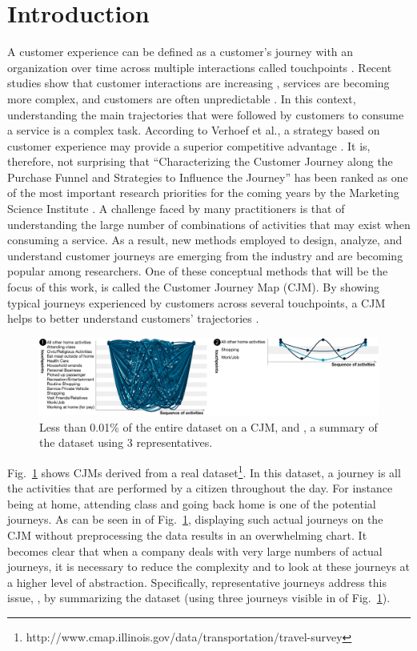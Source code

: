 \documentclass[runningheads]{llncs}
\begin{document}
\section{Introduction}
A customer experience can be defined as a customer's journey with an organization over time across multiple interactions called touchpoints \cite{lemon2016understanding}. Recent studies show that customer interactions are increasing \cite{how_to_improve}, services are becoming more complex, and customers are often unpredictable \cite{key_factors_in}. In this context, understanding the main trajectories that were followed by customers to consume a service is a complex task. According to Verhoef et al., a strategy based on customer experience may provide a superior competitive advantage \cite{lemon2016understanding}. It is, therefore, not surprising that ``Characterizing the Customer Journey along the Purchase Funnel and Strategies to Influence the Journey'' has been ranked as one of the most important research priorities for the coming years by the Marketing Science Institute  \cite{MSI2016}. A challenge faced by many practitioners is that of understanding the large number of combinations of activities that may exist when consuming a service. As a result, new methods employed to design, analyze, and understand customer journeys are emerging from the industry and are becoming popular among researchers. One of these conceptual methods that will be the focus of this work, is called the Customer Journey Map (CJM). By showing typical journeys experienced by customers across several touchpoints, a CJM helps to better understand customers' trajectories \cite{bernard2017cjm}. 

\begin{figure}[H]
\centering
\includegraphics[width=1\columnwidth]{05_schema/intro2.pdf}
\caption{ Less than 0.01\% of the entire dataset on a CJM, and , a  summary of the dataset using 3 representatives.}
\label{representativejourney}
\end{figure}

Fig.~\ref{representativejourney} shows CJMs derived from a real dataset\footnote{http://www.cmap.illinois.gov/data/transportation/travel-survey
}. In this dataset, a journey is all the activities that are performed by a citizen throughout the day. For instance being at home, attending class and going back home is one of the potential journeys. As can be seen in  of Fig.~{\ref{representativejourney}}, displaying such actual journeys on the CJM without preprocessing the data results in an overwhelming chart. It becomes clear that when a company deals with very large numbers of actual journeys, it is necessary to reduce the complexity and to look at these journeys at a higher level of abstraction. Specifically, representative journeys address this issue, \cite{bernard2019genetic}, by summarizing the dataset (using three journeys visible in  of Fig.~\ref{representativejourney}). 
\end{document}
